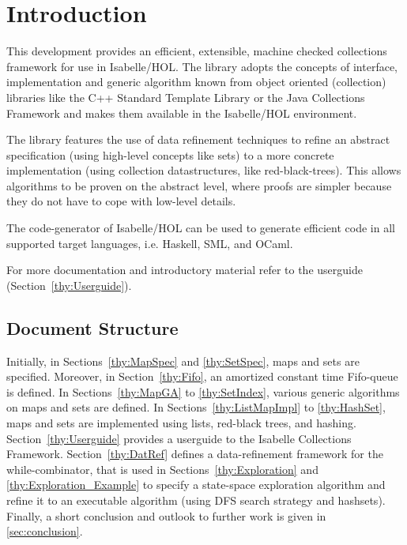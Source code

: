 \section{Introduction}
  This development provides an efficient, extensible, machine checked collections framework for use
  in Isabelle/HOL. The library adopts the concepts of interface, implementation and generic algorithm
  known from object oriented (collection) libraries like the C++ Standard Template Library\cite{C++STL} or 
  the Java Collections Framework\cite{JavaCollFr} and makes them available in the Isabelle/HOL environment.

  The library features the use of data refinement techniques to refine an abstract specification (using high-level concepts like sets) to a more concrete implementation (using collection datastructures, like red-black-trees). This allows algorithms to be proven on the abstract level, where proofs are simpler because they do not have
  to cope with low-level details.

  The code-generator of Isabelle/HOL can be used to generate efficient code in all supported target languages, i.e. Haskell, SML, and OCaml.

  For more documentation and introductory material refer to the userguide (Section~\ref{thy:Userguide}).

\subsection{Document Structure}
  Initially, in Sections~\ref{thy:MapSpec} and \ref{thy:SetSpec}, maps and sets are specified.
  Moreover, in Section~\ref{thy:Fifo}, an amortized constant time Fifo-queue is defined.
  In Sections~\ref{thy:MapGA} to \ref{thy:SetIndex}, various generic algorithms on maps and sets are defined.
  In Sections~\ref{thy:ListMapImpl} to \ref{thy:HashSet}, maps and sets are implemented using lists, red-black trees, and hashing.
  Section~\ref{thy:Userguide} provides a userguide to the Isabelle Collections Framework. Section~\ref{thy:DatRef} defines a data-refinement framework for
  the while-combinator, that is used in Sections~\ref{thy:Exploration} and \ref{thy:Exploration_Example} to specify a state-space exploration algorithm and
  refine it to an executable algorithm (using DFS search strategy and hashsets). Finally, a short conclusion and outlook to further work is given in \ref{sec:conclusion}.

